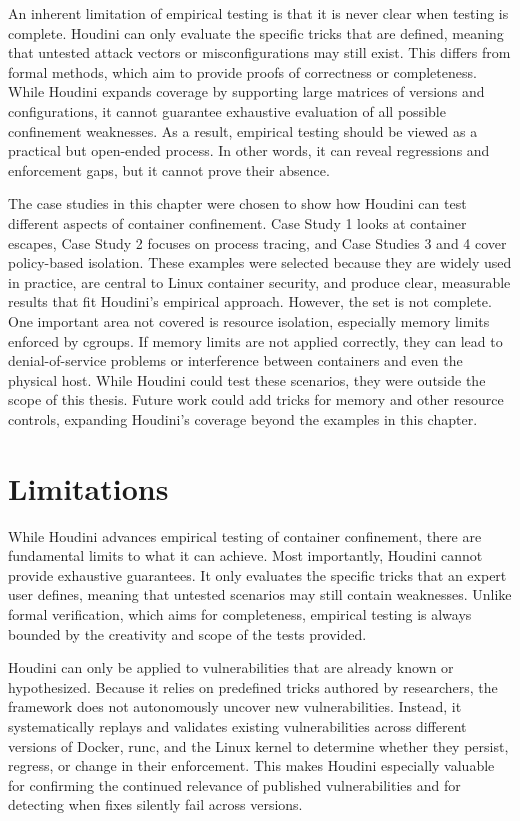 \begin{doublespace}
An inherent limitation of empirical testing is that it is never clear when testing is complete. Houdini can only evaluate the specific tricks that are defined, meaning that untested attack vectors or misconfigurations may still exist. This differs from formal methods, which aim to provide proofs of correctness or completeness. While Houdini expands coverage by supporting large matrices of versions and configurations, it cannot guarantee exhaustive evaluation of all possible confinement weaknesses. As a result, empirical testing should be viewed as a practical but open-ended process. In other words, it can reveal regressions and enforcement gaps, but it cannot prove their absence.

The case studies in this chapter were chosen to show how Houdini can test different aspects of container confinement. Case Study 1 looks at container escapes, Case Study 2 focuses on process tracing, and Case Studies 3 and 4 cover policy-based isolation. These examples were selected because they are widely used in practice, are central to Linux container security, and produce clear, measurable results that fit Houdini’s empirical approach. However, the set is not complete. One important area not covered is resource isolation, especially memory limits enforced by cgroups. If memory limits are not applied correctly, they can lead to denial-of-service problems or interference between containers and even the physical host. While Houdini could test these scenarios, they were outside the scope of this thesis. Future work could add tricks for memory and other resource controls, expanding Houdini’s coverage beyond the examples in this chapter.

\section{Limitations}

While Houdini advances empirical testing of container confinement, there are fundamental limits to what it can achieve. Most importantly, Houdini cannot provide exhaustive guarantees. It only evaluates the specific tricks that an expert user defines, meaning that untested scenarios may still contain weaknesses. Unlike formal verification, which aims for completeness, empirical testing is always bounded by the creativity and scope of the tests provided.

Houdini can only be applied to vulnerabilities that are already known or hypothesized. Because it relies on predefined tricks authored by researchers, the framework does not autonomously uncover new vulnerabilities. Instead, it systematically replays and validates existing vulnerabilities across different versions of Docker, runc, and the Linux kernel to determine whether they persist, regress, or change in their enforcement. This makes Houdini especially valuable for confirming the continued relevance of published vulnerabilities and for detecting when fixes silently fail across versions.
\end{doublespace}